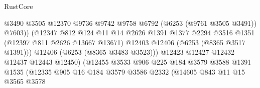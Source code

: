 \begin{lexlean}{RustCore}
\begin{coremodule}
                                            @3490
                                            @3505
                                            @12370
                                            @9736
                                            @9742
                                            @9758
                                            @6792
                                            (@6253 (@9761 @3505 @3491))
                                            @7603))
                                        (@12347
                                          @812
                                          @124
                                          @11
                                          @14
                                          @2626
                                          @1391
                                          @1377
                                          @2294
                                          @3516
                                          @1351
                                          (@12397 @811 @2626 @13667 @13671)
                                          @12403
                                          @12406
                                          (@6253 (@8365 @3517 @1391)))
                                        @12406
                                        (@6253 (@8365 @3483 @3523)))
                                      @12423
                                      @12427
                                      @12432
                                      @12437
                                      @12443
                                      @12450)
                                    (@12455
                                      @3533
                                      @906
                                      @225
                                      @184
                                      @3579
                                      @3588
                                      @1391
                                      @1535
                                      (@12335
                                        @905
                                        @16
                                        @184
                                        @3579
                                        @3586
                                        @2332
                                        (@14605
                                          @843
                                          @11
                                          @15
                                          @3565
                                          @3578

\end{coremodule}
\end{lexlean}
